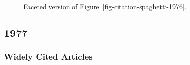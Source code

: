 \documentclass[
  10pt,
  letterpaper,
  DIV=11,
  numbers=noendperiod,
  twoside]{scrartcl}
\begin{document}
\begin{figure}


\caption{\label{fig-citation-facet-1976}Faceted version of
Figure~\ref{fig-citation-spaghetti-1976}.}

\end{figure}%

\newpage

\subsection{1977}\label{sec-s1977}

\subsubsection*{Widely Cited Articles}\label{widely-cited-articles-21}
\end{document}
